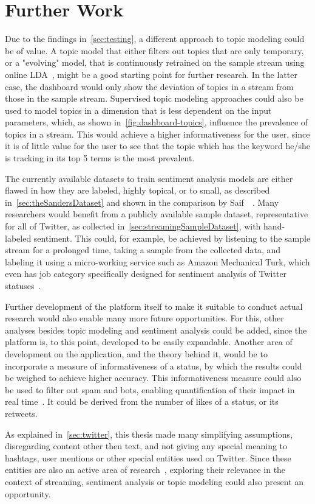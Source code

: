 \chapter{Further Work}
\label{ch:furtherWork}

Due to the findings in~\ref{sec:testing},
a different approach to topic modeling could be of value.
A topic model that either filters out topics that are only temporary,
or a "evolving" model, that is continuously retrained on the sample stream using online LDA~\cite{hoffman2010online},
might be a good starting point for further research.
In the latter case, the dashboard would only show the deviation of topics in a stream from those in the sample stream.
Supervised topic modeling approaches could also be used to model topics in a dimension that is less dependent on the input parameters,
which, as shown in~\ref{fig:dashboard-topics}, influence the prevalence of topics in a stream.
This would achieve a higher informativeness for the user, since it is of little value for the user to
see that the topic which has the keyword he/she is tracking in its top 5 terms is the most prevalent.
\par
The currently available datasets to train sentiment analysis models are either flawed in how they are labeled, highly topical,
or to small, as described in~\ref{sec:theSandersDataset} and shown in the comparison by Saif~\etAl~\cite{Saif2013}.
Many researchers would benefit from a publicly available sample dataset, representative for all of Twitter,
as collected in~\ref{sec:streamingSampleDataset}, with hand-labeled sentiment.
This could, for example, be achieved by listening to the sample stream for a prolonged time,
taking a sample from the collected data, and labeling it using a micro-working service such as Amazon Mechanical Turk,
which even has job category specifically designed for sentiment analysis of Twitter statuses~\cite{mturk}.
\par
Further development of the platform itself to make it suitable to conduct actual research
would also enable many more future opportunities.
For this, other analyses besides topic modeling and sentiment analysis could be added,
since the platform is, to this point, developed to be easily expandable.
Another area of development on the application, and the theory behind it,
would be to incorporate a measure of informativeness of a status,
by which the results could be weighed to achieve higher accuracy.
This informativeness measure could also be used to filter out spam and bots,
enabling quantification of their impact in real time~\cite{haustein2016tweets}.
It could be derived from the number of likes of a status, or its retweets.
\par
As explained in~\ref{sec:twitter}, this thesis made many simplifying assumptions, disregarding content other then text, and not giving any special meaning
to hashtags, user mentions or other special entities used on Twitter.
Since these entities are also an active area of research~\cite{page2012linguistics},
exploring their relevance in the context of streaming, sentiment analysis or topic modeling
could also present an opportunity.